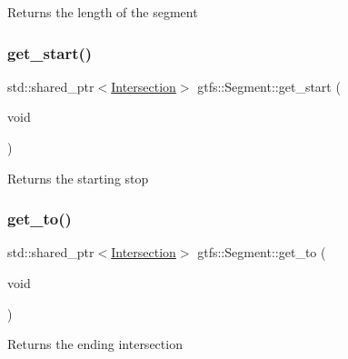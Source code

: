 \begin{DoxyReturn}{Returns}
the length of the segment 
\end{DoxyReturn}
\mbox{\label{classgtfs_1_1Segment_a8f64f5b0859e79e9bdd2c0faa7e50e23}} 
\subsubsection{\texorpdfstring{get\+\_\+start()}{get\_start()}}
{\footnotesize\ttfamily std\+::shared\+\_\+ptr$<$\hyperlink{classgtfs_1_1Intersection}{Intersection}$>$ gtfs\+::\+Segment\+::get\+\_\+start (\begin{DoxyParamCaption}\item[{void}]{ }\end{DoxyParamCaption})\hspace{0.3cm}{\ttfamily [inline]}}

\begin{DoxyReturn}{Returns}
the starting stop 
\end{DoxyReturn}
\mbox{\label{classgtfs_1_1Segment_aba473075f7a10db66b5b99890c39852f}} 
\subsubsection{\texorpdfstring{get\+\_\+to()}{get\_to()}}
{\footnotesize\ttfamily std\+::shared\+\_\+ptr$<$\hyperlink{classgtfs_1_1Intersection}{Intersection}$>$ gtfs\+::\+Segment\+::get\+\_\+to (\begin{DoxyParamCaption}\item[{void}]{ }\end{DoxyParamCaption})\hspace{0.3cm}{\ttfamily [inline]}}

\begin{DoxyReturn}{Returns}
the ending intersection 
\end{DoxyReturn}
\mbox{\label{classgtfs_1_1Segment_a366d9b1437e4175c3f43d312fab09530}} 
